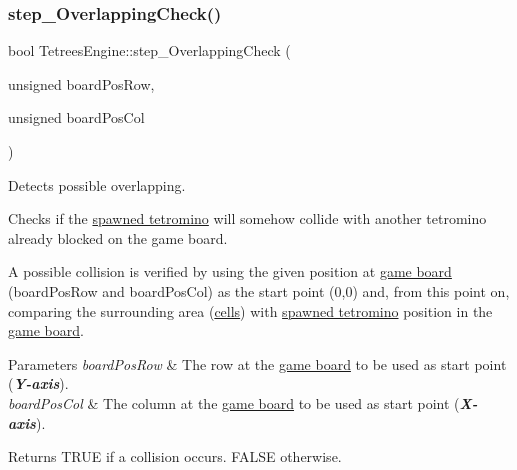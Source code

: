 \subsubsection{\texorpdfstring{step\+\_\+\+Overlapping\+Check()}{step\_OverlappingCheck()}}
{\footnotesize\ttfamily bool Tetrees\+Engine\+::step\+\_\+\+Overlapping\+Check (\begin{DoxyParamCaption}\item[{unsigned}]{board\+Pos\+Row,  }\item[{unsigned}]{board\+Pos\+Col }\end{DoxyParamCaption})\hspace{0.3cm}{\ttfamily [private]}}



Detects possible overlapping. 

Checks if the \hyperlink{classTetreesEngine_a26435ee2f02d9ba70d9e359745114f6e}{spawned tetromino} will somehow collide with another tetromino already blocked on the game board.

A possible collision is verified by using the given position at \hyperlink{classTetreesEngine_a37d082a7816d6731b2703dd6d1a1cb97}{game board} (board\+Pos\+Row and board\+Pos\+Col) as the start point (0,0) and, from this point on, comparing the surrounding area (\hyperlink{TetreesDefs_8hpp_a7c8699d7ca48189b748ba8f94eb9d515}{cells}) with \hyperlink{classTetreesEngine_a26435ee2f02d9ba70d9e359745114f6e}{spawned tetromino} position in the \hyperlink{classTetreesEngine_a37d082a7816d6731b2703dd6d1a1cb97}{game board}. 
\begin{DoxyParams}{Parameters}
{\em board\+Pos\+Row} & The row at the \hyperlink{classTetreesEngine_a37d082a7816d6731b2703dd6d1a1cb97}{game board} to be used as start point ({\itshape {\bfseries Y-\/axis}}). \\
\hline
{\em board\+Pos\+Col} & The column at the \hyperlink{classTetreesEngine_a37d082a7816d6731b2703dd6d1a1cb97}{game board} to be used as start point ({\itshape {\bfseries X-\/axis}}). \\
\hline
\end{DoxyParams}
\begin{DoxyReturn}{Returns}
{\ttfamily T\+R\+UE} if a collision occurs. {\ttfamily F\+A\+L\+SE} otherwise. 
\end{DoxyReturn}
\mbox{\label{classTetreesEngine_a626d60fa8adb2dd024016b5cfed4f6ee}} 
